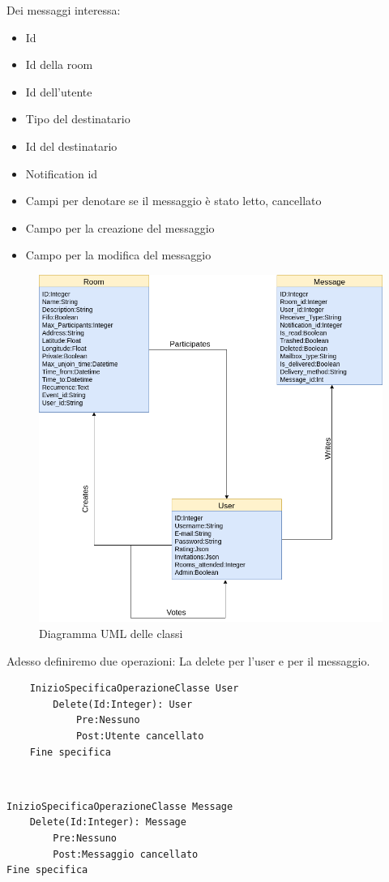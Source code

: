 Dei messaggi interessa:
\begin{itemize}
	\item Id
	\item Id della room
	\item Id dell'utente
	\item Tipo del destinatario
	\item Id del destinatario
	\item Notification id
	\item Campi per denotare se il messaggio è stato letto, cancellato
	\item Campo per la creazione del messaggio
	\item Campo per la modifica del messaggio
\end{itemize}
\begin{figure}[H]
	\centering
	\includegraphics[width=\textwidth]{./media/UML.png}
	\caption{Diagramma UML delle classi}
\end{figure}

Adesso definiremo due operazioni: La delete per l'user e per il messaggio.

\begin{lstlisting}
	InizioSpecificaOperazioneClasse User
		Delete(Id:Integer): User
			Pre:Nessuno
			Post:Utente cancellato
	Fine specifica
\end{lstlisting}
\\
\begin{lstlisting}
InizioSpecificaOperazioneClasse Message
	Delete(Id:Integer): Message
		Pre:Nessuno
		Post:Messaggio cancellato
Fine specifica
\end{lstlisting}


